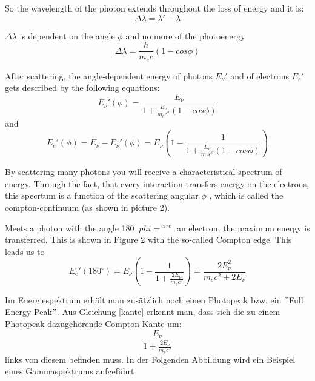 
So the wavelength of the photon extends throughout the loss of energy and it is:
	\begin{equation}
	\Delta \lambda = \lambda ' - \lambda
	\end{equation}

$\Delta \lambda$ is dependent on the angle $\phi$ and no more of the photoenergy
	\begin{equation}
	\Delta \lambda = \frac{h}{m_{e} c}(1-cos \phi)
	\end{equation}

After scattering, the angle-dependent energy of photons $E_{\nu}'$ and of electrons $E_{e}'$ gets described by the following equations:
	\begin{equation}
	E_{\nu}'(\phi) = \frac{E_{\nu}}{1+\frac{E_{\nu}}{m_{e}c^{2}}(1-cos 			\phi)}
	\end{equation}
and
	\begin{equation}
	E_{e}'(\phi) = E_{\nu}-E_{\nu}'(\phi) = E_{\nu}\left(1-\frac{1}{1+\frac{E_{\nu}}{m_{e}c^{2}}(1-cos \phi)}\right)
	\end{equation}

By scattering many photons you will receive a characteristical spectrum of energy. Through the fact, that every interaction transfers energy on the electrons, this specrtum is a function of the scattering angular $\phi$ , which is called the compton-continuum (as shown in picture 2).


Meets a photon with the angle 180 $ \ phi = ^ {\ circ} $ an electron, the maximum energy is transferred. This is shown in Figure 2 with the so-called Compton edge. This leads us to	
	\begin{equation}
	\label{kante}
	E_{e}'(180^{\circ}) = E_{\nu} \left(1-\frac{1}{1+\frac{2E_{\nu}}{m_{e}c^{2}}}\right) = \frac{2E_{\nu}^{2}}{m_{e}c^{2} +2E_{\nu}}
	\end{equation}

Im Energiespektrum erhält man zusätzlich noch einen Photopeak bzw. ein $"$Full Energy Peak$"$. Aus Gleichung \eqref{kante} erkennt man, dass sich die zu einem Photopeak dazugehörende Compton-Kante um:
	\begin{equation}
	\frac{E_{\nu}}{1+\frac{2E_{\nu}}{m_{e}c^{2}}}
	\end{equation}
links von diesem befinden muss. In der Folgenden Abbildung wird ein Beispiel eines Gammaspektrums aufgeführt\\

